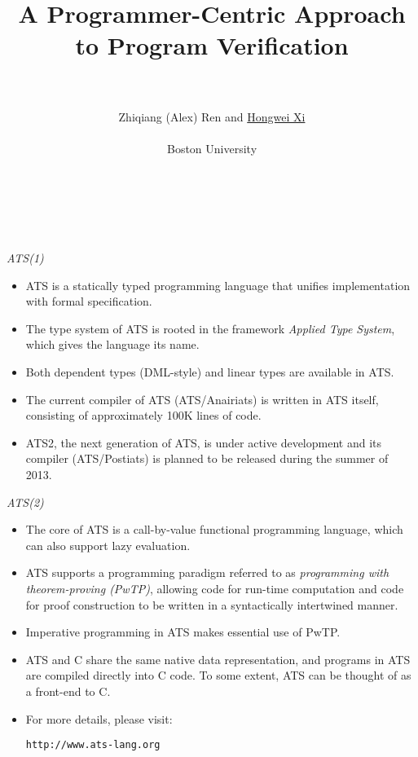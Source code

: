 \documentclass[pdf]{prosper}
\title{%
\huge\bf%
A Programmer-Centric Approach to Program Verification%
}
\author{~\\~\\
{\large Zhiqiang (Alex) Ren and \underline{Hongwei Xi}} \\~\\
{\large Boston University} \\~\\~\\~\\
\institution{Work partly funded by NSF}}
\begin{document}
\maketitle
\begin{slide}{\em ATS(1)}
\begin{itemize}
\item
ATS is a statically typed programming language that unifies implementation
with formal specification.
\item
The type system of ATS is rooted in the framework {\em Applied Type System},
which gives the language its name.
\item
Both dependent types (DML-style) and linear types are available in ATS.
\item
The current compiler of ATS (ATS/Anairiats) is written in ATS itself,
consisting of approximately 100K lines of code.
\item
ATS2, the next generation of ATS, is under active development and its
compiler (ATS/Postiats) is planned to be released during the summer of
2013.
\end{itemize}
\end{slide}
\begin{slide}{\em ATS(2)}
\begin{itemize}
\item
The core of ATS is a call-by-value functional programming language, which
can also support lazy evaluation.
\item
ATS supports a programming paradigm referred to as {\em programming with
theorem-proving (PwTP)}, allowing code for run-time computation and
code for proof construction to be written in a syntactically intertwined
manner.
\item
Imperative programming in ATS makes essential use of PwTP.
\item
ATS and C share the same native data representation, and
programs in ATS are compiled directly into C code. To some extent, ATS
can be thought of as a front-end to C.
\item
For more details, please visit:
\begin{center}
\texttt{http://www.ats-lang.org}
\end{center}
\end{itemize}
\end{slide}
\def\ATS{\mbox{$\cal A\kern-1.5pt T\kern-3pt S$}}
\end{document}
